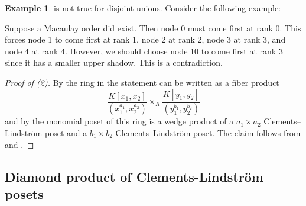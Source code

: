 \documentclass[11pt, reqno]{amsart}
\theoremstyle{plain} %
\theoremstyle{definition}
\newtheorem{ex}[thm]{Example}
\theoremstyle{remark}
\numberwithin{equation}{section}  %
\begin{document}
\begin{ex}
 is not true for disjoint unions. Consider the following example:

\begin{center}
\end{center}
Suppose a Macaulay order did exist. Then node 0 must come first at rank 0. This forces node 1 to come first at rank 1, node 2 at rank 2, node 3 at rank 3, and node 4 at rank 4. However, we should choose node 10 to come first at rank 3 since it has a smaller upper shadow. This is a contradiction.
\end{ex}

\begin{proof}[Proof of  (2)]
By  the ring in the statement can be written as a fiber product
\[
\frac{K[x_1,x_2]}{(x_1^{a_1}, x_2^{a_2})}\times_K \frac{K[y_1,y_2]}{(y_1^{b_1}, y_2^{b_2})}
\]
and by  the monomial poset of this ring is a wedge product of a $a_1\times a_2$ Clements--Lindstr\"om poset and a $b_1\times b_2$ Clements--Lindstr\"om poset. The claim follows from  and .

\end{proof}

\subsection{Diamond product of Clements-Lindstr\"om posets}
\end{document}
